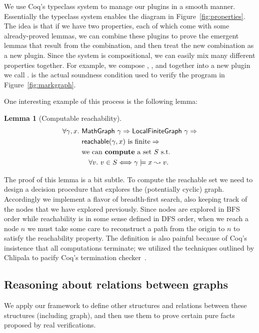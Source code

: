We use Coq's typeclass system to manage our plugins in a smooth manner.  Essentially the typeclass system enables the diagram in Figure~\ref{fig:properties}.  The idea is that if we have two properties, each of which come with some already-proved lemmas, we can combine these plugins to prove the emergent lemmas that result from the combination, and then treat the new combination as a new plugin.  Since the system is compositional, we can easily mix many different properties together.  For example, we compose , , and  together into a new plugin we call .   is the actual soundness condition used to verify the program in Figure~\ref{fig:markgraph}.

{\color{magenta}
One interesting example of this process is the following lemma:
\newtheorem{mylem}{Lemma}
\begin{mylem}[Computable reachability]\label{lem:computereach}
\[
\begin{split}
\forall \gamma, x.~&\mathsf{MathGraph}\ \gamma => \mathsf{LocalFiniteGraph}\ \gamma =>\\
        & \mathsf{reachable}(\gamma, x)\textrm{ is finite} => \\
        & \text{we can \textbf{compute} a set }S \text{ s.t.\ } \\
        & \quad \forall v.~v \in S <=> \gamma \models x \leadsto v.
\end{split}
\]
\end{mylem}
The proof of this lemma is a bit subtle.  To compute the reachable set
we need to design a decision procedure that explores the (potentially cyclic)
graph.  Accordingly we implement a flavor of breadth-first search, also keeping
track of the nodes that we have explored previously.  Since nodes are explored
in BFS order while reachability is in some sense defined in DFS order, when
we reach a node $n$ we must take some care to reconstruct a path from the origin to $n$
to satisfy the reachability property.  The definition is also
painful because of Coq's insistence that all computations terminate; we 
utilized the techniques outlined by Chlipala to pacify Coq's termination checker~\cite{chlipala:cpdt}.
}

\subsection{Reasoning about relations between graphs} %

We apply our framework to define other structures and relations
between these structures (including graph), and then use them to prove
certain pure facts proposed by real verifications.


